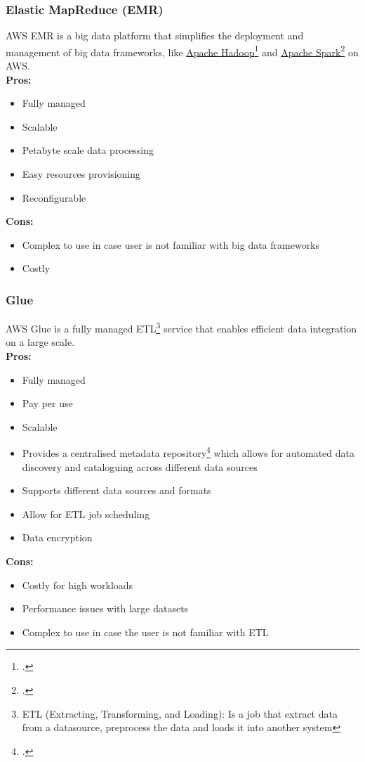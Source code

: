         \subsubsection{Elastic MapReduce (EMR)}
        \label{aws:emr}
 AWS EMR is a big data platform that simplifies the deployment and management of big data frameworks, like \href{https://hadoop.apache.org/}{Apache Hadoop}\footcite[a library for distributed data processing]{site:hadoop} and \href{https://spark.apache.org/}{Apache Spark}\footcite[an engine for distributed data processing]{site:spark} on AWS.\\
        \textbf{Pros:}
        \begin{itemize}
            \item Fully managed
            \item Scalable
            \item Petabyte scale data processing
            \item Easy resources provisioning
            \item Reconfigurable
        \end{itemize}
        \textbf{Cons:}
        \begin{itemize}
            \item Complex to use in case user is not familiar with big data frameworks
            \item Costly
        \end{itemize}

        \subsubsection{Glue}
        \label{aws:glue}
 AWS Glue is a fully managed ETL\footnote{ETL (Extracting, Transforming, and Loading): Is a job that extract data from a datasource, preprocess the data and loads it into another system} service that enables efficient data integration on a large scale.\\
        \textbf{Pros:}
        \begin{itemize}
            \item Fully managed
            \item Pay per use
            \item Scalable
            \item Provides a centralised metadata repository\footcite{site:aws-glue-catalog} which allows for automated data discovery and cataloguing across different data sources
            \item Supports different data sources and formats
            \item Allow for ETL job scheduling
            \item Data encryption
        \end{itemize}
        \textbf{Cons:}
        \begin{itemize}
            \item Costly for high workloads
            \item Performance issues with large datasets
            \item Complex to use in case the user is not familiar with ETL
        \end{itemize}

